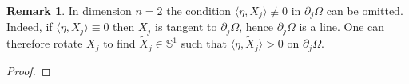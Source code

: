 \documentclass[10 pt,a4paper]{article}
\theoremstyle{definition}
\newtheorem{remark}[definition]{Remark}
\begin{document}
\begin{remark}\label{rem_keyR2}
	In dimension $n=2$ the condition $\langle \eta, X_j \rangle \not \equiv 0$ in $\partial_j\Omega$ can be omitted. Indeed, if $\langle \eta, X_j \rangle \equiv 0$ then $X_j$ is tangent to $\partial_j\Omega$, hence $\partial_j\Omega$ is a line. One can therefore rotate $X_j$ to find $\widetilde X_j \in \mathbb{S}^{1}$ such that $\langle \eta, \widetilde X_j \rangle >0$ on  $\partial_j\Omega$.
\end{remark}

\begin{proof}

\end{proof}
\end{document}
